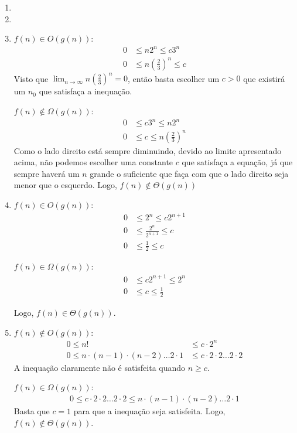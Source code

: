 \documentclass{article}
\begin{document}
\begin{enumerate}
\begin{enumerate}
		\item

		\item

		\item $f(n) \in O(g(n))$:
		\begin{align*}
			0 &\le n2^n \le c 3^n \\
			0 &\le n\left(\frac{2}{3}\right)^n \le c
		\end{align*}
		Visto que $\lim_{n\to\infty}n\left(\frac{2}{3}\right)^n = 0$, então
		basta escolher um $c > 0$ que existirá um $n_0$ que satisfaça a
		inequação.

		$f(n) \notin \Omega(g(n))$:
		\begin{align*}
			0 &\le c 3^n \le n 2^n \\
			0 &\le c \le n \left(\frac{2}{3}\right)^n
		\end{align*}
		Como o lado direito está sempre diminuindo, devido ao limite
		apresentado acima, não podemos escolher uma constante $c$ que satisfaça
		a equação, já que sempre haverá um $n$ grande o suficiente que faça com
		que o lado direito seja menor que o esquerdo. Logo, $f(n) \notin
		\Theta(g(n))$

		\item $f(n) \in O(g(n))$:
		\begin{align*}
			0 &\le 2^n \le c 2^{n+1} \\
			0 &\le \frac{2^n}{2^{n+1}} \le c \\
			0 &\le \frac{1}{2} \le c
		\end{align*}

		$f(n) \in \Omega(g(n))$:
		\begin{align*}
			0 &\le c 2^{n+1} \le 2^n \\
			0 &\le c \le \frac{1}{2}
		\end{align*}

		Logo, $f(n) \in \Theta(g(n))$.

		\item $f(n) \notin O(g(n))$:
		\begin{align*}
			0 \le n! &\le c \cdot 2^n \\
			0 \le n \cdot (n-1) \cdot (n-2) \ldots 2 \cdot 1 &\le c \cdot 2
			\cdot 2 \ldots 2 \cdot 2
		\end{align*}
		A inequação claramente não é satisfeita quando $n \ge c$.

		$f(n) \in \Omega(g(n))$:
		\begin{align*}
			0 \le c \cdot 2 \cdot 2 \ldots 2 \cdot 2 \le n \cdot (n-1) \cdot
			(n-2) \ldots 2 \cdot 1
		\end{align*}
		Basta que $c=1$ para que a inequação seja satisfeita. Logo, $f(n)
		\notin \Theta(g(n))$.


\end{enumerate}
\end{enumerate}
\end{document}

